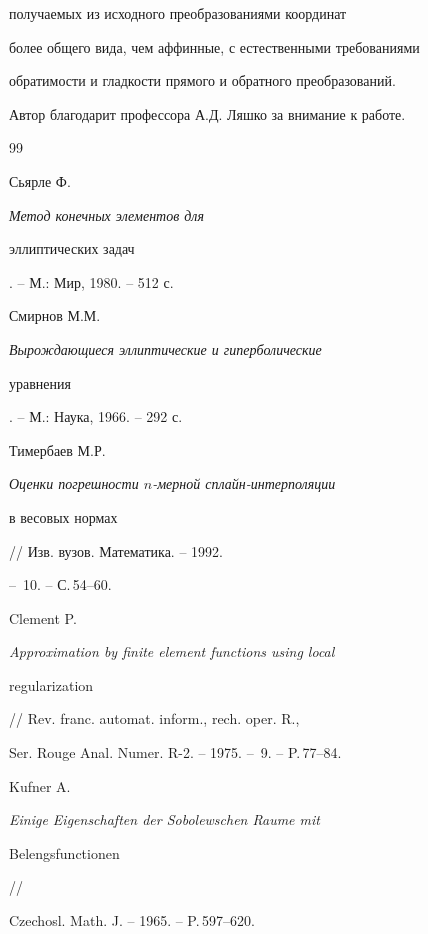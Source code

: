получаемых из исходного преобразованиями координат 


более общего вида, чем аффинные, с естественными требованиями 


обратимости и гладкости прямого и обратного преобразований. 





Автор благодарит профессора А.Д. Ляшко за внимание к работе. 








\begin{thebibliography}{99}







Сьярле Ф. {\em Метод конечных элементов для 


эллиптических задач}. -- М.: Мир, 1980. -- 512 с.







Смирнов М.М. {\em Вырождающиеся эллиптические и гиперболические 


уравнения}. -- М.: Наука, 1966. -- 292 с.







Тимербаев М.Р. {\em Оценки погрешности $n$-мерной сплайн-интерполяции


в весовых нормах} // Изв. вузов. Математика. -- 1992.


-- \No\,10. -- С.\,54--60.







Clement P. {\em Approximation by finite element functions using local


regularization} // Rev. franc. automat. inform., rech. oper. R.,


Ser. Rouge Anal. Numer. R-2. -- 1975. -- \No\,9. -- P.\,77--84. 







Kufner A. {\em Einige Eigenschaften der Sobolewschen Raume mit


Belengsfunctionen} // 


Czechosl. Math. J. -- 1965. -- P.\,597--620.






\end{thebibliography}
